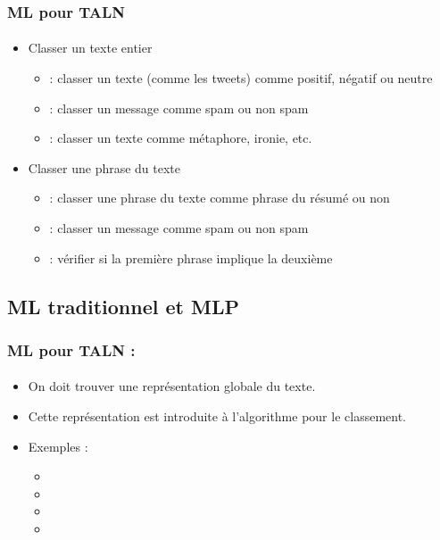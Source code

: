 \documentclass[xcolor=table]{beamer}
\begin{document}
\begin{frame}
	\frametitle{ML pour TALN}
	\framesubtitle{\insertsection}
	
	\begin{itemize}
		\item Classer un texte entier 
		\begin{itemize}
			\item {} : classer un texte (comme les tweets) comme positif, négatif ou neutre
			\item {} : classer un message comme spam ou non spam
			\item {} : classer un texte comme métaphore, ironie, etc.
		\end{itemize}
		\item Classer une phrase du texte
		\begin{itemize}
			\item {} : classer une phrase du texte comme phrase du résumé ou non
			\item {} : classer un message comme spam ou non spam
			\item {} : vérifier si la première phrase implique la deuxième
		\end{itemize}
	\end{itemize}
	
\end{frame}

\subsection{ML traditionnel et MLP}

\begin{frame}
	\frametitle{ML pour TALN : \insertsection}
	\framesubtitle{\insertsubsection}
	
	\begin{itemize}
		\item On doit trouver une représentation globale du texte.
		\item Cette représentation est introduite à l'algorithme pour le classement.
		\item Exemples :
		\begin{itemize}
			\item {}
			\item {}
			\item {}
			\item {}
		\end{itemize}
	\end{itemize}
	
\end{frame}
\end{document}
